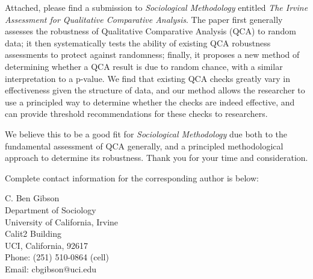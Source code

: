 \documentclass[10pt,stdletter,dateno,sigleft]{newlfm} %
\begin{document}
\begin{newlfm}


Attached, please find a submission to \emph{Sociological Methodology} entitled \emph{The Irvine Assessment for Qualitative Comparative Analysis}. The paper first generally assesses the robustness of Qualitative Comparative Analysis (QCA) to random data; it then systematically tests the ability of existing QCA robustness assessments to protect against randomness; finally, it proposes a new method of determining whether a QCA result is due to random chance, with a similar interpretation to a p-value. We find that existing QCA checks greatly vary in effectiveness given the structure of data, and our method allows the researcher to use a principled way to determine whether the checks are indeed effective, and can provide threshold recommendations for these checks to researchers. 

We believe this to be a good fit for \emph{Sociological Methodology} due both to the fundamental assessment of QCA generally, and a principled methodological approach to determine its robustness.  Thank you for your time and consideration.

Complete contact information for the corresponding author is below: 

\setlength\parindent{24pt}
\indent C. Ben Gibson \\ 
\indent Department of Sociology \\ 
\indent University of California, Irvine \\
 Calit2 Building\\
\indent UCI, California, 92617\\
\indent Phone: (251) 510-0864 (cell)\\
\indent Email: cbgibson@uci.edu\\


\end{newlfm}
\end{document}
